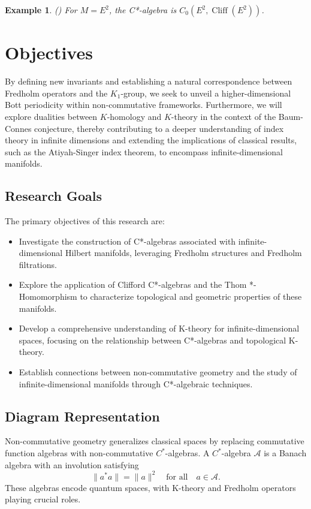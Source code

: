 \documentclass[11pt, twoside, a4paper]{article}
\theoremstyle{mytheoremstyle}
\newtheorem{example}[theorem]{Example}
\begin{document}
\begin{example} ({\color{blue}\cite{trout1984}})
For \( M = E^{2} \), the C*-algebra is \( C_{0}(E^{2}, \operatorname{Cliff}(E^{2})) \).
\end{example}

\section{Objectives}
By defining new invariants and establishing a natural correspondence between Fredholm operators and the \(K_1\)-group, we seek to unveil a higher-dimensional Bott periodicity within non-commutative frameworks. Furthermore, we will explore dualities between \(K\)-homology and \(K\)-theory in the context of the Baum-Connes conjecture, thereby contributing to a deeper understanding of index theory in infinite dimensions and extending the implications of classical results, such as the Atiyah-Singer index theorem, to encompass infinite-dimensional manifolds.

\subsection{Research Goals}
The primary objectives of this research are:
\begin{itemize}
    \item Investigate the construction of C*-algebras associated with infinite-dimensional Hilbert manifolds, leveraging Fredholm structures and Fredholm filtrations.
    \item Explore the application of Clifford C*-algebras and the Thom *-Homomorphism to characterize topological and geometric properties of these manifolds.
    \item Develop a comprehensive understanding of K-theory for infinite-dimensional spaces, focusing on the relationship between C*-algebras and topological K-theory.
    \item Establish connections between non-commutative geometry and the study of infinite-dimensional manifolds through C*-algebraic techniques.
\end{itemize}

\subsection{Diagram Representation}

Non-commutative geometry generalizes classical spaces by replacing commutative function algebras with non-commutative \( C^* \)-algebras. A \( C^* \)-algebra \( \mathcal{A} \) is a Banach algebra with an involution satisfying
\[
\|a^* a\| = \|a\|^2 \quad \text{for all} \quad a \in \mathcal{A}.
\]
These algebras encode quantum spaces, with K-theory and Fredholm operators playing crucial roles.
\end{document}

